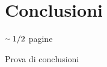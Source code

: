 \chapter{Conclusioni}

\begin{center}
	$\smallsim 1/2$ pagine
\end{center}

Prova di conclusioni

\lipsum[10]

\lipsum[11]